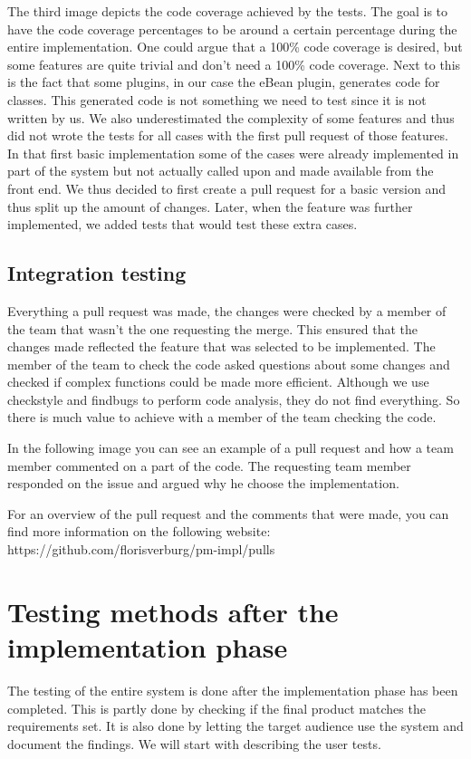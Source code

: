 The third image depicts the code coverage achieved by the tests.
The goal is to have the code coverage percentages to be around a certain percentage during the entire implementation.
One could argue that a 100\% code coverage is desired, but some features are quite trivial and don't need a 100\% code coverage.
Next to this is the fact that some plugins, in our case the eBean plugin, generates code for classes.
This generated code is not something we need to test since it is not written by us.
We also underestimated the complexity of some features and thus did not wrote the tests for all cases with the first pull request of those features.
In that first basic implementation some of the cases were already implemented in part of the system but not actually called upon and made available from the front end.
We thus decided to first create a pull request for a basic version and thus split up the amount of changes.
Later, when the feature was further implemented, we added tests that would test these extra cases.


\subsection{Integration testing}
Everything a pull request was made, the changes were checked by a member of the team that wasn't the one requesting the merge.
This ensured that the changes made reflected the feature that was selected to be implemented.
The member of the team to check the code asked questions about some changes and checked if complex functions could be made more efficient.
Although we use checkstyle and findbugs to perform code analysis, they do not find everything.
So there is much value to achieve with a member of the team checking the code.

In the following image you can see an example of a pull request and how a team member commented on a part of the code.
The requesting team member responded on the issue and argued why he choose the implementation.


For an overview of the pull request and the comments that were made, you can find more information on the following website:
https://github.com/florisverburg/pm-impl/pulls

\section{Testing methods after the implementation phase}
The testing of the entire system is done after the implementation phase has been completed.
This is partly done by checking if the final product matches the requirements set.
It is also done by letting the target audience use the system and document the findings.
We will start with describing the user tests.

